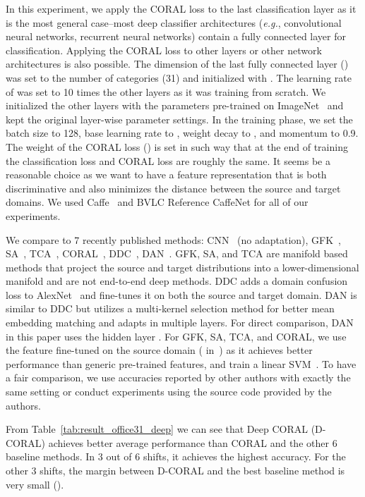 \documentclass[graybox]{svmult}
\newcommand\eg{\emph{e.g.}}
\begin{document}
In this experiment, we apply the CORAL loss to the last classification layer
as it is the most general case--most deep classifier architectures (\eg, convolutional neural networks, recurrent neural networks) contain a fully connected layer for classification. Applying the CORAL loss to other layers or other network architectures is also possible. The dimension of the last fully connected layer () was set to the number of categories (31) and initialized with . The learning rate of  was set to 10 times the other layers as it was training from scratch. We initialized the other layers with the parameters pre-trained on ImageNet~\cite{imagenet} and kept the original layer-wise parameter settings. In the training phase, we set the batch size to 128, base learning rate to , weight decay to , and momentum to 0.9. The weight of the CORAL loss () is set in such way that at the end of training the classification loss and CORAL loss are roughly the same. It seems be a reasonable choice as we want to have a feature representation that is both discriminative and also minimizes the distance between the source and target domains. We used Caffe~\cite{caffe} and BVLC Reference CaffeNet for all of our experiments.

We compare to 7 recently published methods: CNN~\cite{alexnet} (no adaptation), GFK~\cite{gfk}, SA~\cite{sa}, TCA~\cite{tca}, CORAL~\cite{coral}, DDC~\cite{tzeng_arxiv15}, DAN~\cite{dan_long15}. GFK, SA, and TCA are manifold based methods that project the source and target distributions into a lower-dimensional manifold and are not end-to-end deep methods. DDC adds a domain confusion loss to AlexNet~\cite{alexnet} and fine-tunes it on both the source and target domain. DAN is similar to DDC but utilizes a multi-kernel selection method for better mean embedding matching and adapts in multiple layers. For direct comparison, DAN in this paper uses the hidden layer . For GFK, SA, TCA, and CORAL, we use the  feature fine-tuned on the source domain ( in~\cite{coral}) as it achieves better performance than generic pre-trained features, and train a linear SVM~\cite{sa,coral}. To have a fair comparison, we use accuracies reported by other authors with exactly the same setting or conduct experiments using the source code provided by the authors.

From Table~\ref{tab:result_office31_deep} we can see that Deep CORAL (D-CORAL) achieves better average performance than CORAL and the other 6 baseline methods. In 3 out of 6 shifts, it achieves the highest accuracy. For the other 3 shifts, the margin between D-CORAL and the best baseline method is very small ().
\end{document}
